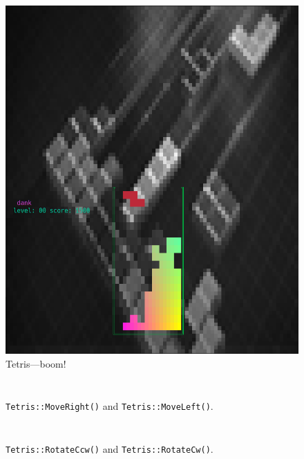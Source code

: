 \begin{figure}
\begin{minipage}{0.45\textwidth}
    \includegraphics[width=1\linewidth]{media/tetris-postscore.png}
    \caption{Tetris---boom!}
  \end{minipage}
\end{figure}

\begin{figure}
  \centering
  \begin{minipage}{0.45\textwidth}
    \inputminted[]{C}{code-tetris/moveleft.h}
  \end{minipage}\hfill
  \begin{minipage}{0.45\textwidth}
    \inputminted[]{C}{code-tetris/moveright.h}
  \end{minipage}
  \caption{\texttt{Tetris::MoveRight()} and \texttt{Tetris::MoveLeft()}.}
  \label{list:tetris-move}
\end{figure}

\begin{figure}
  \centering
  \begin{minipage}{0.45\textwidth}
    \inputminted[]{C}{code-tetris/rotate-cw.h}
  \end{minipage}\hfill
  \begin{minipage}{0.45\textwidth}
    \inputminted[]{C}{code-tetris/rotate-ccw.h}
  \end{minipage}
  \caption{\texttt{Tetris::RotateCcw()} and \texttt{Tetris::RotateCw()}.}
  \label{list:tetris-rotate}
\end{figure}

